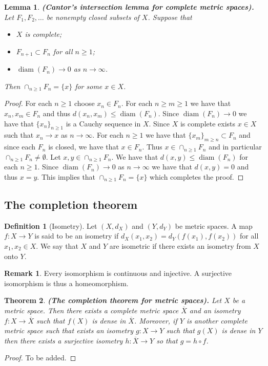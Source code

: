 \documentclass[11pt,a4paper]{article}
\theoremstyle{definition}
\newtheorem{definition}{Definition}[section]
\newtheorem{remark}{Remark}[section]
\theoremstyle{plain}
\newtheorem{theorem}{Theorem}[section]
\newtheorem{lemma}[theorem]{Lemma}
\DeclareMathOperator{\diam}{diam}
\renewcommand{\tt}[1]{\textnormal{\textbf{(#1).}}} %
\begin{document}
  \begin{lemma}
    \tt{Cantor’s intersection lemma for complete metric spaces}
    Let $F_1,F_2,\dots$ be nonempty closed subsets of $X$. Suppose that
    \begin{itemize}
      \item $X$ is complete;
      \item $F_{n+1} \subset F_{n}$ for all $n \geq 1$;
      \item $\diam(F_n) \to 0$ as $n \to \infty$.
    \end{itemize}
    Then $\cap_{n \geq 1}{F_n} = \{x\}$ for some $x \in X$.
  \end{lemma}
  \begin{proof}
    For each $n \geq 1$ choose $x_n \in F_n$. For each $n \geq m \geq 1$
    we have that $x_n,x_m \in F_n$ and thus $d(x_n,x_m) \le \diam(F_n)$.
    Since $\diam(F_n) \to 0$ we have that $\{x_n\}_{n \geq 1}$ is a Cauchy
    sequence in $X$. Since $X$ is complete exists $x \in X$ such that 
    $x_n \to x$ as $n \to \infty$. For each $n \geq 1$ we have that 
    $\{x_m\}_{m \geq n} \subset F_n$ and since each $F_n$ is closed, we
    have that $x \in F_n$. Thus $x \in \cap_{n \geq 1}{F_n}$ and in 
    particular $\cap_{n \geq 1}{F_n} \neq \emptyset$. Let 
    $x,y \in \cap_{n \geq 1}{F_n}$. We have that $d(x,y) \le \diam(F_n)$
    for each $n \geq 1$. Since $\diam(F_n) \to 0$ as $n \to \infty$ we
    have that $d(x,y) = 0$ and thus $x=y$. This implies that
    $\cap_{n \geq 1}{F_n} = \{x\}$ which completes the proof.
  \end{proof}
  
  \subsection{The completion theorem}

  \begin{definition}[Isometry]
    Let $(X,d_X)$ and $(Y,d_Y)$ be metric spaces. A map $f \colon X \to Y$ 
    is said to be an isometry if $d_X(x_1,x_2) = d_Y(f(x_1),f(x_2))$ for all 
    $x_1,x_2 \in X$. We say that $X$ and $Y$ are isometric if there exists 
    an isometry from $X$ onto $Y$.
  \end{definition}
  
  \begin{remark}
    Every isomorphism is continuous and injective. A surjective isomorphism
    is thus a homeomorphism.
  \end{remark}
  
  \begin{theorem}
    \tt{The completion theorem for metric spaces}
    Let $X$ be a metric space. Then there exists a complete metric space
    $\overline{X}$ and an isometry $f \colon X \to \overline{X}$ such that 
    $f(X)$ is dense in $\overline{X}$. Moreover, if $Y$ is another complete 
    metric space such that exists an isometry $g \colon X \to Y$ such that
    $g(X)$ is dense in $Y$ then there exists a surjective isometry
    $h \colon \overline{X} \to Y$ so that $g = h \circ f$.
  \end{theorem}
  \begin{proof}
    To be added.
  \end{proof}
\end{document}
